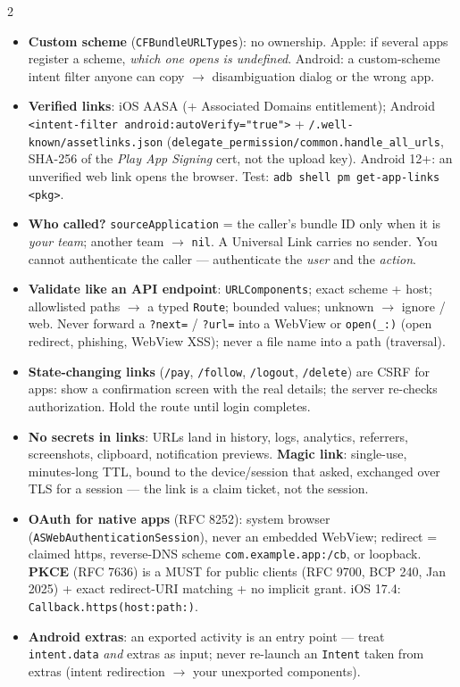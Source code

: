 \documentclass[8pt]{extarticle}
\newcommand\ct[1]{\texttt{#1}}
\newcommand\hd[1]{\par\vspace{3pt}\noindent{\bfseries\color{sheetBlue}#1}\par\vspace{1pt}}
\begin{document}
\begin{multicols}{2}
\raggedright{}

\hd{How it works}
\begin{itemize}
  \item \textbf{Custom scheme} (\ct{CFBundleURLTypes}): no ownership. Apple: if several apps
        register a scheme, \emph{which one opens is undefined}. Android: a custom-scheme
        intent filter anyone can copy $\to$ disambiguation dialog or the wrong app.
  \item \textbf{Verified links}: iOS AASA (+ Associated Domains entitlement); Android
        \ct{<intent-filter android:autoVerify="true">} + \ct{/.well-known/assetlinks.json}
        (\ct{delegate\_permission/common.handle\_all\_urls}, SHA-256 of the \emph{Play App
        Signing} cert, not the upload key). Android 12+: an unverified web link opens the
        browser. Test: \ct{adb shell pm get-app-links <pkg>}.
  \item \textbf{Who called?} \ct{sourceApplication} = the caller's bundle ID only when it is
        \emph{your team}; another team $\to$ \ct{nil}. A Universal Link carries no sender.
        You cannot authenticate the caller — authenticate the \emph{user} and the \emph{action}.
  \item \textbf{Validate like an API endpoint}: \ct{URLComponents}; exact scheme + host;
        allowlisted paths $\to$ a typed \ct{Route}; bounded values; unknown $\to$ ignore / web.
        Never forward a \ct{?next=} / \ct{?url=} into a WebView or \ct{open(\_:)} (open redirect,
        phishing, WebView XSS); never a file name into a path (traversal).
  \item \textbf{State-changing links} (\ct{/pay}, \ct{/follow}, \ct{/logout}, \ct{/delete}) are
        CSRF for apps: show a confirmation screen with the real details; the server re-checks
        authorization. Hold the route until login completes.
  \item \textbf{No secrets in links}: URLs land in history, logs, analytics, referrers,
        screenshots, clipboard, notification previews. \textbf{Magic link}: single-use,
        minutes-long TTL, bound to the device/session that asked, exchanged over TLS for a
        session — the link is a claim ticket, not the session.
  \item \textbf{OAuth for native apps} (RFC 8252): system browser
        (\ct{ASWebAuthenticationSession}), never an embedded WebView; redirect = claimed https,
        reverse-DNS scheme \ct{com.example.app:/cb}, or loopback. \textbf{PKCE} (RFC 7636)
        is a MUST for public clients (RFC 9700, BCP 240, Jan 2025) + exact redirect-URI
        matching + no implicit grant. iOS 17.4: \ct{Callback.https(host:path:)}.
  \item \textbf{Android extras}: an exported activity is an entry point — treat
        \ct{intent.data} \emph{and} extras as input; never re-launch an \ct{Intent} taken from
        extras (intent redirection $\to$ your unexported components).
\end{itemize}


\end{multicols}
\end{document}
